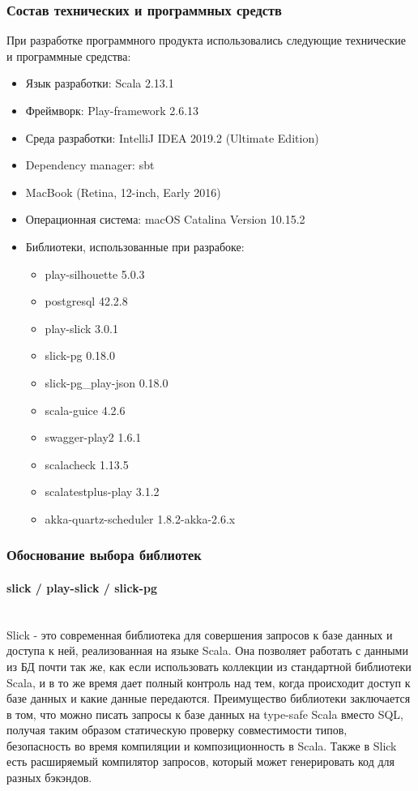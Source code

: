 \documentclass[a4paper,12pt]{article}
\begin{document}
	\subsubsection{Состав технических и программных средств}
	При разработке программного продукта использовались следующие технические и программные средства:
	\begin{itemize}
		\item Язык разработки: Scala 2.13.1
		\item Фреймворк: Play-framework 2.6.13 \cite{play}
		\item Среда разработки: IntelliJ IDEA 2019.2 (Ultimate Edition)
		\item Dependency manager: sbt
		\item MacBook (Retina, 12-inch, Early 2016)
		\item Операционная система: macOS Catalina Version 10.15.2
		\item Библиотеки, использованные при разрабоке: 
		\begin{itemize}
			\item play-silhouette 5.0.3
			\item postgresql 42.2.8
			\item play-slick 3.0.1
			\item slick-pg 0.18.0
			\item slick-pg\_play-json 0.18.0
			\item scala-guice 4.2.6
			\item swagger-play2 1.6.1
			\item scalacheck 1.13.5
			\item scalatestplus-play 3.1.2
			\item akka-quartz-scheduler 1.8.2-akka-2.6.x
		\end{itemize}
	\end{itemize}

	\subsubsection{Обоснование выбора библиотек}
	
	\paragraph{slick / play-slick / slick-pg\\ \\}
	
	Slick - это современная библиотека для совершения запросов к базе данных и доступа к ней, реализованная на языке Scala. Она позволяет работать с данными из БД почти так же, как если использовать коллекции из стандартной библиотеки Scala, и в то же время дает полный контроль над тем, когда происходит доступ к базе данных и какие данные передаются. Преимущество библиотеки заключается в том, что можно писать запросы к базе данных на type-safe Scala вместо SQL, получая таким образом статическую проверку совместимости типов, безопасность во время компиляции и композиционность в Scala. Также в Slick есть расширяемый компилятор запросов, который может генерировать код для разных бэкэндов. 
	
\end{document}
